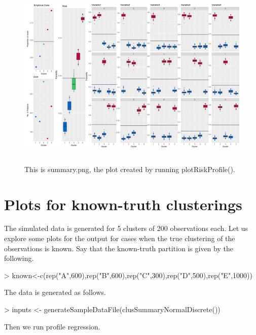 \documentclass{article}
\begin{document}
\begin{figure}[ht]
\centering
\includegraphics[height=9cm]{"summary"}
\caption{This is summary.png, the plot created by running plotRiskProfile().\label{fig:summary}}
\end{figure}

\section{Plots for known-truth clusterings}
The simulated data is generated for 5 clusters of 200 observations each. Let us explore some plots for the output for cases when the true clustering of the observations is known. Say that the known-truth partition is given by the following.

\begin{Schunk}
\begin{Sinput}
> known<-c(rep("A",600),rep("B",600),rep("C",300),rep("D",500),rep("E",1000))
\end{Sinput}
\end{Schunk}

The data is generated as follows. 

\begin{Schunk}
\begin{Sinput}
> inputs <- generateSampleDataFile(clusSummaryNormalDiscrete())
\end{Sinput}
\end{Schunk}

Then we run profile regression.
\end{document}
